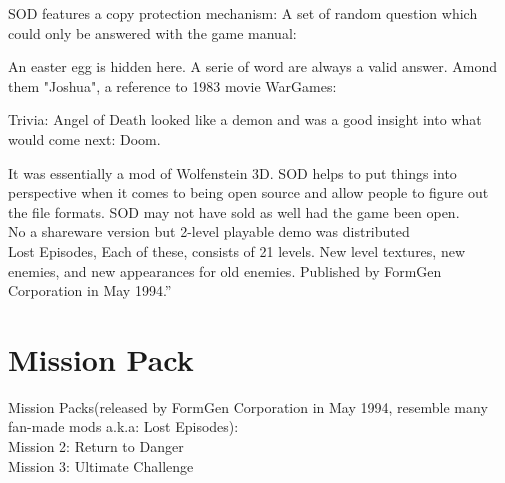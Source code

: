 \documentclass[book.tex]{subfiles}
\begin{document}
   \par
\begin{figure}[H]
\centering
 \end{figure}
 \par


 SOD features a copy protection mechanism: A set of random question which could only be answered with the game manual:\\
    \par
\begin{figure}[H]
\centering
 \end{figure}
 \par
 An easter egg is hidden here. A serie of word are always a valid answer. Amond them "Joshua", a reference to 1983 movie WarGames:\\
    \par
\begin{figure}[H]
\centering
 \end{figure}
 \par



Trivia: Angel of Death looked like a demon and was a good insight into what would come next: Doom.




It was essentially a mod of Wolfenstein 3D. SOD helps to put things into perspective when it comes to being open source and allow people to figure out the file formats. SOD may not have sold as well had the game been open.\\
No a shareware version  but  2-level playable demo was distributed\\
Lost Episodes, Each of these, consists of 21 levels. New level textures, new enemies, and new appearances for old enemies. Published by FormGen Corporation in May 1994.''
\\
\section{Mission Pack}
Mission Packs(released by FormGen Corporation in May 1994, resemble many fan-made mods a.k.a: Lost Episodes):\\
Mission 2: Return to Danger\\
Mission 3: Ultimate Challenge\\
\end{document}
